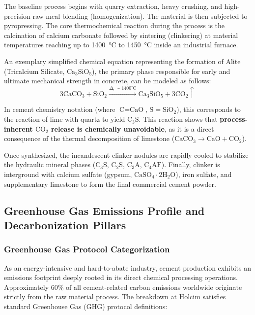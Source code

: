 The baseline process begins with quarry extraction, heavy crushing, and high-precision raw meal blending (homogenization). The material is then subjected to pyropressing. The core thermochemical reaction during the process is the calcination of calcium carbonate followed by sintering (clinkering) at material temperatures reaching up to \num{1400}~\si{\celsius} to \num{1450}~\si{\celsius} inside an industrial furnace.

An exemplary simplified chemical equation representing the formation of Alite (Tricalcium Silicate, $\text{Ca}_3\text{SiO}_5$), the primary phase responsible for early and ultimate mechanical strength in concrete, can be modeled as follows:
\begin{equation}
    3\text{CaCO}_3 + \text{SiO}_2 \xrightarrow{\Delta, \sim 1400^\circ\text{C}} \text{Ca}_3\text{SiO}_5 + 3\text{CO}_2\uparrow
\end{equation}

In cement chemistry notation (where $\text{C} = \text{CaO}$, $\text{S} = \text{SiO}_2$), this corresponds to the reaction of lime with quartz to yield $\text{C}_3\text{S}$. This reaction shows that \textbf{process-inherent $\text{CO}_2$ release is chemically unavoidable}, as it is a direct consequence of the thermal decomposition of limestone ($\text{CaCO}_3 \rightarrow \text{CaO} + \text{CO}_2$). 

Once synthesized, the incandescent clinker nodules are rapidly cooled to stabilize the hydraulic mineral phases ($\text{C}_3\text{S}$, $\text{C}_2\text{S}$, $\text{C}_3\text{A}$, $\text{C}_4\text{AF}$). Finally, clinker is interground with calcium sulfate (gypsum, $\text{CaSO}_4\cdot2\text{H}_2\text{O}$), iron sulfate, and supplementary limestone to form the final commercial cement powder.

\subsection{Greenhouse Gas Emissions Profile and Decarbonization Pillars}

\subsubsection{Greenhouse Gas Protocol Categorization}
As an energy-intensive and hard-to-abate industry, cement production exhibits an emissions footprint deeply rooted in its direct chemical processing operations. Approximately \num{60}\% of all cement-related carbon emissions worldwide originate strictly from the raw material process. The breakdown at Holcim satisfies standard Greenhouse Gas (GHG) protocol definitions:

